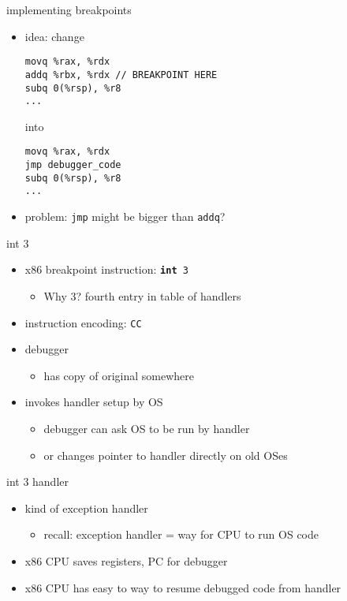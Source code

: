 
\begin{frame}[fragile,label=implBreak]{implementing breakpoints}
\lstset{language=myasm,style=small}
\begin{itemize}
    \item idea: change
\begin{lstlisting}
movq %rax, %rdx
addq %rbx, %rdx // BREAKPOINT HERE
subq 0(%rsp), %r8
...
\end{lstlisting}
into
\begin{lstlisting}
movq %rax, %rdx
jmp debugger_code 
subq 0(%rsp), %r8
...
\end{lstlisting}
    \item<2> problem: {\tt jmp} might be bigger than {\tt addq}?
\end{itemize}
\end{frame}

\begin{frame}[fragile,label=implBreak2]{int 3}
    \begin{itemize}
    \item x86 breakpoint instruction: {\tt \textbf{int} 3}
        \begin{itemize}
        \item Why 3? fourth entry in table of handlers
        \end{itemize}
    \item {} instruction encoding: {\tt CC}
    \item debugger 
        \begin{itemize}
        \item has copy of original somewhere
        \end{itemize}
    \item invokes handler setup by OS
        \begin{itemize}
        \item debugger can ask OS to be run by handler
        \item or changes pointer to handler directly on old OSes
        \end{itemize}
    \end{itemize}
\end{frame}

\begin{frame}{int 3 handler}
    \begin{itemize}
    \item kind of exception handler
        \begin{itemize}
        \item recall: exception handler = way for CPU to run OS code
        \end{itemize}
    \item x86 CPU saves registers, PC for debugger
    \item x86 CPU has easy to way to resume debugged code from handler
    \end{itemize}
\end{frame}

